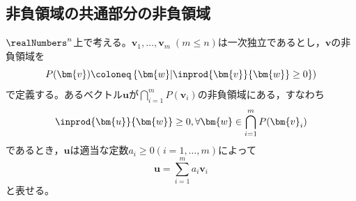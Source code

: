         \subsection{非負領域の共通部分の非負領域}
            \begin{shadebox}
                $\realNumbers^n$上で考える。$\bm{v}_1,\dotsc,\bm{v}_m\;(m\leq n)$は一次独立であるとし，$\bm{v}$の非負領域を
                \[P(\bm{v})\coloneq\left\{\bm{w}|\inprod{\bm{v}}{\bm{w}}\geq0\right\})\]
                で定義する。あるベクトル$\bm{u}$が$\bigcap_{i=1}^{m}{P(\bm{v}_i)}$の非負領域にある，すなわち
                \[\inprod{\bm{u}}{\bm{w}}\geq0,\forall\bm{w}\in\bigcap_{i=1}^{m}{P(\bm{v}_i)}\]
                であるとき，$\bm{u}$は適当な定数$a_i\geq0(i=1,\dotsc,m)$によって
                \[\bm{u} = \sum_{i=1}^{m}{a_i\bm{v}_i}\]
                と表せる。
            \end{shadebox}
